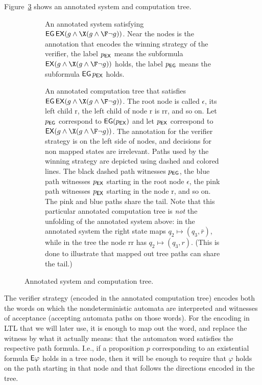 \begin{example}
Figure~\ref{fig:annotated-model-tree} shows an annotated system and computation tree.
%
\begin{figure}
\begin{subfigure}[t]{\linewidth}\center

\caption{An annotated system satisfying $\EG\EX(g \land \X(g \land \F\neg g))$.
  Near the nodes is the annotation that encodes the winning strategy of the verifier,
  the label $p_{\operatorname{\mathsf{EX}}}$ means the subformula $\EX(g \land \X(g \land \F\neg g))$ holds,
  the label $p_{\operatorname{\mathsf{EG}}}$ means the subformula $\operatorname{\mathsf{EG}} p_{\operatorname{\mathsf{EX}}}$ holds.}
\label{fig:annotated-model}
\end{subfigure}

\vspace{0.5cm}
\begin{subfigure}[t]{\linewidth}\center
\center

\caption{%
  An annotated computation tree that satisfies
  $\EG\EX(g \land \X(g \land \F\neg g))$.
  The root node is called $\epsilon$,
  its left child $\mathrm r$, the left child of node $\mathrm r$ is $\mathrm{rr}$, and so on.
  Let $p_{\operatorname{\mathsf{EG}}}$ correspond to $\operatorname{\mathsf{EG}}(p_{\operatorname{\mathsf{EX}}})$
  and let $p_{\operatorname{\mathsf{EX}}}$ correspond to $\EX(g \land \X(g \land \F\neg g))$.
  The annotation for the verifier strategy is on the left side of nodes,
  and decisions for non mapped states are irrelevant.
  Paths used by the winning strategy are depicted using dashed and colored lines.
  The black dashed path witnesses $p_{\operatorname{\mathsf{EG}}}$,
  the blue path witnesses $p_{\operatorname{\mathsf{EX}}}$ starting in the root node $\epsilon$,
  the pink path witnesses $p_{\operatorname{\mathsf{EX}}}$ starting in the node $\mathrm r$, and so on.
  The pink and blue paths share the tail.
  Note that this particular annotated computation tree
  is \emph{not} the unfolding of the annotated system above:
  in the annotated system the right state maps $q_2 \mapsto (q_3, \bar r)$,
  while in the tree the node $\mathrm{rr}$ has $q_2 \mapsto (q_3, r)$.
  (This is done to illustrate that mapped out tree paths can share the tail.)
  }
\label{fig:annotated-computation-tree}
\end{subfigure}
\caption{Annotated system and computation tree.}
\label{fig:annotated-model-tree}
\end{figure}
\end{example}


The verifier strategy (encoded in the annotated computation tree) encodes both
the words on which the nondeterministic automata are interpreted and
witnesses of acceptance
(accepting automata paths on those words).
For the encoding in LTL that we will later use,
it is enough to map out the word,
and replace the witness by what it actually means:
that the automaton word satisfies the respective path formula.
I.e.,
if a proposition $p$ corresponding to an existential formula ${\operatorname{\mathsf{E}}} \varphi$ holds in a tree node,
then it will be enough to require that $\varphi$ holds
on the path starting in that node and that follows the directions encoded in the tree.

